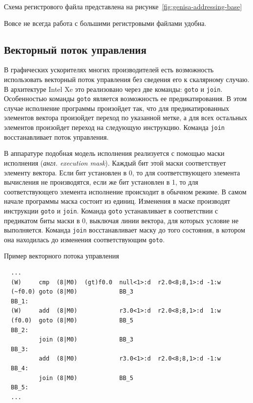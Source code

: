 Схема регистрового файла представлена на рисунке~\cref{fig:genisa-addressing-base}

Вовсе не всегда работа с большими регистровыми файлами удобна.

\subsection{Векторный поток управления}\label{subsec:overview/logical/simdcf}

В графических ускорителях многих производителей есть возможность использовать векторный поток управления без сведения его к скалярному случаю. В архитектуре Intel Xe это реализовано через две команды: \texttt{goto} и \texttt{join}. Особенностью команды \texttt{goto} является возможность ее предикатирования. В этом случае исполнение программы произойдет так, что для предикатированных элементов вектора произойдет переход по указанной метке, а для всех остальных элементов произойдет переход на следующую инструкцию. Команда \texttt{join} восстанавливает поток управления.

В аппаратуре подобная модель исполнения реализуется с помощью маски исполнения (\textit{англ. execution mask}). Каждый бит этой маски соответствует элементу вектора. Если бит установлен в 0, то для соответствующего элемента вычисления не производятся, если же бит установлен в 1, то для соответствующего элемента исполнение происходит в обычном режиме. В самом начале программы маска состоит из единиц. Изменения в маске производят инструкции \texttt{goto} и \texttt{join}. Команда \texttt{goto} устанавливает в соответствии с предикатом биты маски в 0, выключая линии вектора, для которых условие не выполняется. Команда \texttt{join} восстанавливает маску до того состояния, в котором она находилась до изменения соответствующим \texttt{goto}.

\begin{ListingEnv}[!h]
    \captiondelim{ } 
    \caption{Пример векторного потока управления}\label{lst:simdcf}
    \begin{verbatim}
  ...
  (W)     cmp  (8|M0)  (gt)f0.0  null<1>:d  r2.0<8;8,1>:d -1:w
  (~f0.0) goto (8|M0)            BB_3
  BB_1:
  (W)     add  (8|M0)            r3.0<1>:d  r2.0<8;8,1>:d  1:w
  (f0.0)  goto (8|M0)            BB_5
  BB_2:
          join (8|M0)            BB_3
  BB_3:
          add  (8|M0)            r3.0<1>:d  r2.0<8;8,1>:d -1:w
  BB_4:
          join (8|M0)            BB_5
  BB_5:
  ...
    \end{verbatim}
\end{ListingEnv}

